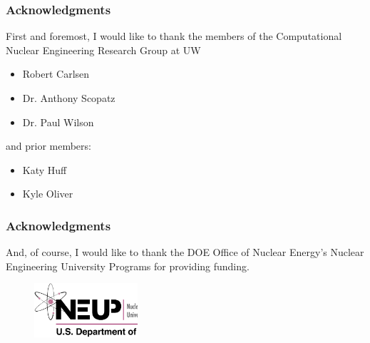 \begin{frame}[ctb!]
  \frametitle{Acknowledgments}
  First and foremost, I would like to thank the members of the
  Computational Nuclear Engineering Research Group at UW 
  \begin{itemize}
    \item Robert Carlsen
    \item Dr. Anthony Scopatz
    \item Dr. Paul Wilson
  \end{itemize}
  
  \vspace{0.2cm}
  
  and prior members:
  \begin{itemize}
    \item Katy Huff
    \item Kyle Oliver
  \end{itemize}

\end{frame}

\begin{frame}[ctb!]
  \frametitle{Acknowledgments}
  And, of course, I would like to thank the DOE Office of Nuclear Energy's 
  Nuclear Engineering University Programs for providing funding. 
  \begin{figure}[htbp!]
    \begin{center}
      \includegraphics[height=2cm]{neup.ps}
    \end{center}
    \label{fig:neup}
  \end{figure}
\end{frame}
